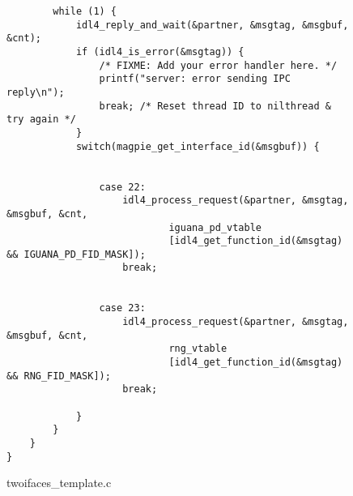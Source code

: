 \begin{figure}
\begin{verbatim}
        while (1) {
            idl4_reply_and_wait(&partner, &msgtag, &msgbuf, &cnt);
            if (idl4_is_error(&msgtag)) {
                /* FIXME: Add your error handler here. */
                printf("server: error sending IPC reply\n");
                break; /* Reset thread ID to nilthread & try again */
            }
            switch(magpie_get_interface_id(&msgbuf)) {


                case 22:
                    idl4_process_request(&partner, &msgtag, &msgbuf, &cnt,
                            iguana_pd_vtable
                            [idl4_get_function_id(&msgtag) && IGUANA_PD_FID_MASK]);
                    break;


                case 23:
                    idl4_process_request(&partner, &msgtag, &msgbuf, &cnt,
                            rng_vtable
                            [idl4_get_function_id(&msgtag) && RNG_FID_MASK]);
                    break;

            }
        }
    }
}
\end{verbatim}
\caption{twoifaces\_template.c}
\label{stubs.twoifaces.template}
\end{figure}

